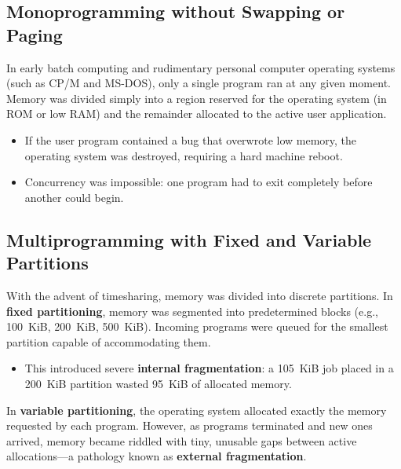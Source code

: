 \subsection{Monoprogramming without Swapping or Paging}
In early batch computing and rudimentary personal computer operating systems (such as CP/M and MS-DOS), only a single program ran at any given moment. Memory was divided simply into a region reserved for the operating system (in ROM or low RAM) and the remainder allocated to the active user application.
\begin{itemize}
    \item If the user program contained a bug that overwrote low memory, the operating system was destroyed, requiring a hard machine reboot.
    \item Concurrency was impossible: one program had to exit completely before another could begin.
\end{itemize}

\subsection{Multiprogramming with Fixed and Variable Partitions}
With the advent of timesharing, memory was divided into discrete partitions. In \textbf{fixed partitioning}, memory was segmented into predetermined blocks (e.g., 100~KiB, 200~KiB, 500~KiB). Incoming programs were queued for the smallest partition capable of accommodating them.
\begin{itemize}
    \item This introduced severe \textbf{internal fragmentation}: a 105~KiB job placed in a 200~KiB partition wasted 95~KiB of allocated memory.
\end{itemize}

In \textbf{variable partitioning}, the operating system allocated exactly the memory requested by each program. However, as programs terminated and new ones arrived, memory became riddled with tiny, unusable gaps between active allocations---a pathology known as \textbf{external fragmentation}.

